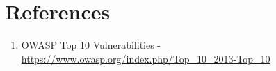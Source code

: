 \chapter{References}

\begin{enumerate}
\item OWASP Top 10 Vulnerabilities - \url{https://www.owasp.org/index.php/Top\_10\_2013-Top\_10} 
\end{enumerate}
